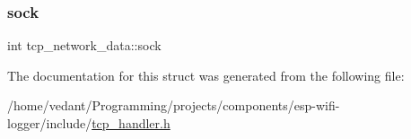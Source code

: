 \mbox{\label{structtcp__network__data_a78063825cce60cb5f121e2c87ccb6dbb}} 
\subsubsection{\texorpdfstring{sock}{sock}}
{\footnotesize\ttfamily int tcp\+\_\+network\+\_\+data\+::sock}



The documentation for this struct was generated from the following file\+:\begin{DoxyCompactItemize}
\item 
/home/vedant/\+Programming/projects/components/esp-\/wifi-\/logger/include/\hyperlink{tcp__handler_8h}{tcp\+\_\+handler.\+h}\end{DoxyCompactItemize}
